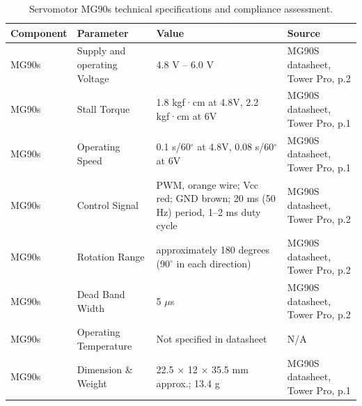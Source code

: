 \documentclass[lettersize,journal]{IEEEtran}
\begin{document}
\begin{table}[ht]
	\centering
	\caption{Servomotor MG90s technical specifications and compliance assessment.}
	\label{tab:MG90s}
	\scriptsize
	\renewcommand{\arraystretch}{1.2}
	\begin{tabular}{|p{1.4cm}|p{1.8cm}|p{1.8cm}|p{1.8cm}|}
		\hline
		\textbf{Component} &
		\textbf{Parameter} &
		\textbf{Value} &
		\textbf{Source}\\
		\hline
		
		MG90s &
		Supply and operating Voltage  &
		4.8 V – 6.0 V &
		MG90S datasheet, Tower Pro, p.2 \\
		\hline
		
		MG90s &
		Stall Torque &
		1.8 kgf·cm at 4.8V, 2.2 kgf·cm at 6V &
		MG90S datasheet, Tower Pro, p.1\\
		\hline
		
		MG90s &
		Operating Speed &
		0.1 s/60$^\circ$ at 4.8V, 0.08 s/60$^\circ$ at 6V &
		MG90S datasheet, Tower Pro, p.1\\
		\hline
		
		MG90s &
		Control Signal &
		PWM, orange wire; Vcc red; GND brown; 20 ms (50 Hz) period, 1--2 ms duty cycle &
		MG90S datasheet, Tower Pro, p.2\\
		\hline
		
		MG90s &
		Rotation Range &
		approximately 180 degrees (90$^\circ$ in each direction) &
		MG90S datasheet, Tower Pro, p.2\\
		\hline
		
		MG90s &
		Dead Band Width &
		5 $\mu$s &
		MG90S datasheet, Tower Pro, p.2\\
		\hline
		
		MG90s &
		Operating Temperature &
		Not specified in datasheet &
		N/A\\
		\hline
		
		MG90s &
		Dimension \& Weight &
		22.5 $\times$ 12 $\times$ 35.5 mm approx.; 13.4 g &
		MG90S datasheet, Tower Pro, p.1\\
		\hline
		
	\end{tabular}
\end{table}
\end{document}
